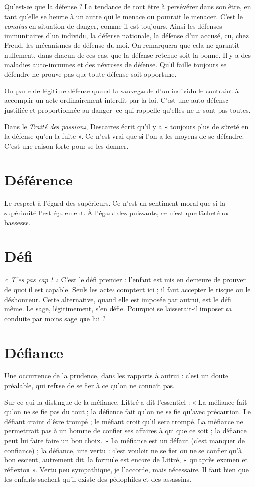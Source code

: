 Qu'est-ce que la défense ? La tendance de tout être à persévérer dans son
être, en tant qu’elle se heurte à un autre qui le menace ou pourrait le
menacer. C’est le {\it conatus} en situation de danger, comme il est toujours. Ainsi
les défenses immunitaires d’un individu, la défense nationale, la défense d’un
accusé, ou, chez Freud, les mécanismes de défense du moi. On remarquera
que cela ne garantit nullement, dans chacun de ces cas, que la défense retenue
soit la bonne. Il y a des maladies auto-immunes et des névroses de défense.
Qu'il faille toujours se défendre ne prouve pas que toute défense soit opportune.

On parle de légitime défense quand la sauvegarde d’un individu le
contraint à accomplir un acte ordinairement interdit par la loi. C’est une auto-défense
justifiée et proportionnée au danger, ce qui rappelle qu’elles ne le sont
pas toutes.

Dans le {\it Traité des passions}, Descartes écrit qu’il y a « toujours plus de sûreté
en la défense qu’en la fuite ». Ce n’est vrai que si l’on a les moyens de se
défendre. C’est une raison forte pour se les donner.

\section{Déférence}
Le respect à l'égard des supérieurs. Ce n’est un sentiment moral
que si la supériorité l’est également. À l’égard des puissants,
ce n’est que lâcheté ou bassesse.

\section{Défi}
{\it « T'es pas cap ! »} C’est le défi premier : l’enfant est mis en demeure de
prouver de quoi il est capable. Seuls les actes comptent ici ; il faut
accepter le risque ou le déshonneur. Cette alternative, quand elle est imposée
par autrui, est le défi même. Le sage, légitimement, s’en défie. Pourquoi se laisserait-il
imposer sa conduite par moins sage que lui ?

\section{Défiance}
Une occurrence de la prudence, dans les rapports à autrui :
c'est un doute préalable, qui refuse de se fier à ce qu’on ne
connaît pas.

Sur ce qui la distingue de la méfiance, Littré a dit l’essentiel : « La méfiance
fait qu’on ne se fie pas du tout ; la défiance fait qu’on ne se fie qu'avec précaution.
Le défiant craint d’être trompé ; le méfiant croit qu’il sera trompé. La
méfiance ne permettrait pas à un homme de confier ses affaires à qui que ce
soit ; la défiance peut lui faire faire un bon choix. » La méfiance est un défaut
(c’est manquer de confiance) ; la défiance, une vertu : c’est vouloir ne se fier ou
ne se confier qu’à bon escient, autrement dit, la formule est encore de Littré,
« qu'après examen et réflexion ». Vertu peu sympathique, je l'accorde, mais
nécessaire. Il faut bien que les enfants sachent qu’il existe des pédophiles et des
assassins.

